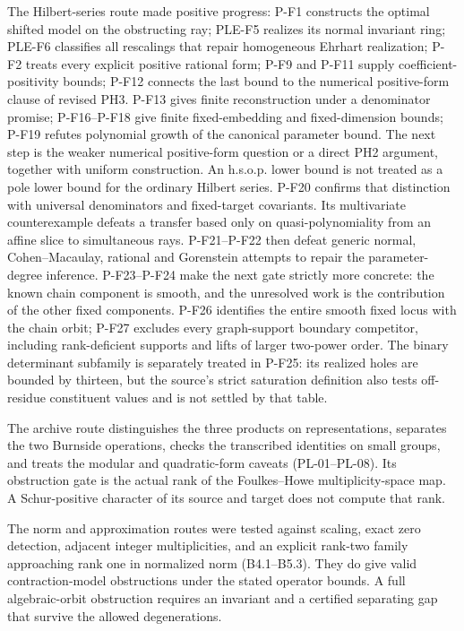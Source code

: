 \documentclass[11pt,a4paper]{article}
\begin{document}
The Hilbert-series route made positive progress: P-F1 constructs the
optimal shifted model on the obstructing ray; PLE-F5 realizes its normal
invariant ring; PLE-F6 classifies all rescalings that repair homogeneous
Ehrhart realization; P-F2 treats every explicit positive rational form;
P-F9 and P-F11 supply coefficient-positivity bounds; P-F12 connects the
last bound to the numerical positive-form clause of revised PH3.
P-F13 gives finite reconstruction under a denominator promise;
P-F16--P-F18 give finite fixed-embedding and fixed-dimension bounds;
P-F19 refutes polynomial growth of the canonical parameter bound.
The next step is the weaker numerical positive-form question or a
direct PH2 argument, together with uniform construction. An h.s.o.p.
lower bound is not treated as a pole lower bound for the ordinary
Hilbert series.
P-F20 confirms that distinction with universal denominators and
fixed-target covariants. Its multivariate counterexample defeats a
transfer based only on quasi-polynomiality from an affine slice to
simultaneous rays. P-F21--P-F22 then defeat generic normal,
Cohen--Macaulay, rational and Gorenstein attempts to repair the
parameter-degree inference. P-F23--P-F24 make the next gate
strictly more concrete: the known chain component is smooth, and
the unresolved work is the contribution of the other fixed
components. P-F26 identifies the entire smooth fixed locus with
the chain orbit; P-F27 excludes every graph-support boundary
competitor, including rank-deficient supports and lifts of larger
two-power order. The binary determinant subfamily is separately treated
in P-F25: its realized holes are bounded by thirteen, but the
source's strict saturation definition also tests off-residue
constituent values and is not settled by that table.

The archive route distinguishes the three products on representations,
separates the two Burnside operations, checks the transcribed identities
on small groups, and treats the modular and quadratic-form caveats
(PL-01--PL-08). Its obstruction gate is the actual rank of the
Foulkes--Howe multiplicity-space map. A Schur-positive character of its
source and target does not compute that rank.

The norm and approximation routes were tested against scaling, exact
zero detection, adjacent integer multiplicities, and an explicit rank-two
family approaching rank one in normalized norm (B4.1--B5.3). They do give
valid contraction-model obstructions under the stated operator bounds.
A full algebraic-orbit obstruction requires an invariant and a certified
separating gap that survive the allowed degenerations.
\end{document}
